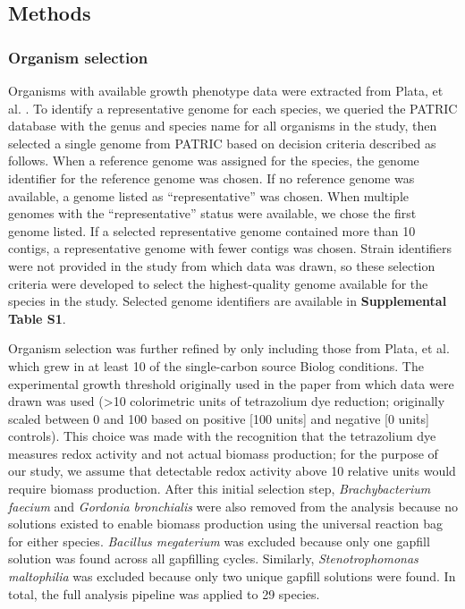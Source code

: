 \documentclass[11pt,twocolumn,notitlepage,openany,twoside]{book}
\begin{document}
\begin{refsection}
\section{Methods}
\subsubsection{Organism selection}

Organisms with available growth phenotype data were extracted from Plata, et al. \cite{Plata2015-bc}. To identify a representative genome for each species, we queried the PATRIC database \cite{Wattam2017-tk} with the genus and species name for all organisms in the study, then selected a single genome from PATRIC based on decision criteria described as follows. When a reference genome was assigned for the species, the genome identifier for the reference genome was chosen. If no reference genome was available, a genome listed as “representative” was chosen. When multiple genomes with the “representative” status were available, we chose the first genome listed. If a selected representative genome contained more than 10 contigs, a representative genome with fewer contigs was chosen. Strain identifiers were not provided in the study from which data was drawn, so these selection criteria were developed to select the highest-quality genome available for the species in the study. Selected genome identifiers are available in \textbf{Supplemental Table S1}.

Organism selection was further refined by only including those from Plata, et al. which grew in at least 10 of the single-carbon source Biolog conditions. The experimental growth threshold originally used in the paper from which data were drawn was used (>10 colorimetric units of tetrazolium dye reduction; originally scaled between 0 and 100 based on positive [100 units] and negative [0 units] controls). This choice was made with the recognition that the tetrazolium dye measures redox activity and not actual biomass production; for the purpose of our study, we assume that detectable redox activity above 10 relative units would require biomass production. After this initial selection step, \textit{Brachybacterium faecium} and \textit{Gordonia bronchialis} were also removed from the analysis because no solutions existed to enable biomass production using the universal reaction bag for either species. \textit{Bacillus megaterium} was excluded because only one gapfill solution was found across all gapfilling cycles. Similarly, \textit{Stenotrophomonas maltophilia} was excluded because only two unique gapfill solutions were found. In total, the full analysis pipeline was applied to 29 species.


\end{refsection}
\end{document}
